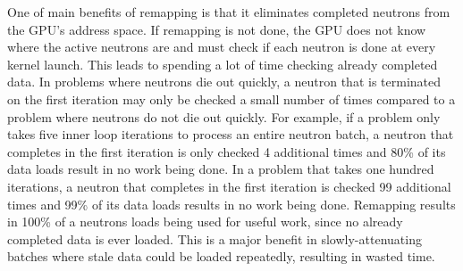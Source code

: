 One of main benefits of remapping is that it eliminates completed neutrons from the GPU's address space.  If remapping is not done, the GPU does not know where the active neutrons are and must check if each neutron is done at every kernel launch.  This leads to spending a lot of time checking already completed data.  In problems where neutrons die out quickly, a neutron that is terminated on the first iteration may only be checked a small number of times compared to a problem where neutrons do not die out quickly.  For example, if a problem only takes five inner loop iterations to process an entire neutron batch, a neutron that completes in the first iteration is only checked 4 additional times and 80\% of its data loads result in no work being done.  In a problem that takes one hundred iterations, a neutron that completes in the first iteration is checked 99 additional times and 99\% of its data loads results in no work being done.  Remapping results in 100\% of a neutrons loads being used for useful work, since no already completed data is ever loaded.  This is a major benefit in slowly-attenuating batches where stale data could be loaded repeatedly, resulting in wasted time.  %





